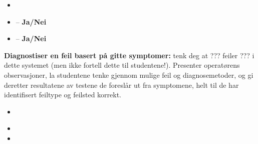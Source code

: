 \begin{itemize}
\item{} {\it }
\item{}  -- {\bf Ja/Nei}
\item{}  -- {\bf Ja/Nei}
\end{itemize}

\vskip 10pt

\noindent
{\bf Diagnostiser en feil basert på gitte symptomer:} tenk deg at ??? feiler ??? i dette systemet (men ikke fortell dette til studentene!). Presenter operatørens observasjoner, la studentene tenke gjennom mulige feil og diagnosemetoder, og gi deretter resultatene av testene de foreslår ut fra symptomene, helt til de har identifisert feiltype og feilsted korrekt.

\begin{itemize}
\item{} {\it }
\item{}
\item{}
\end{itemize}




